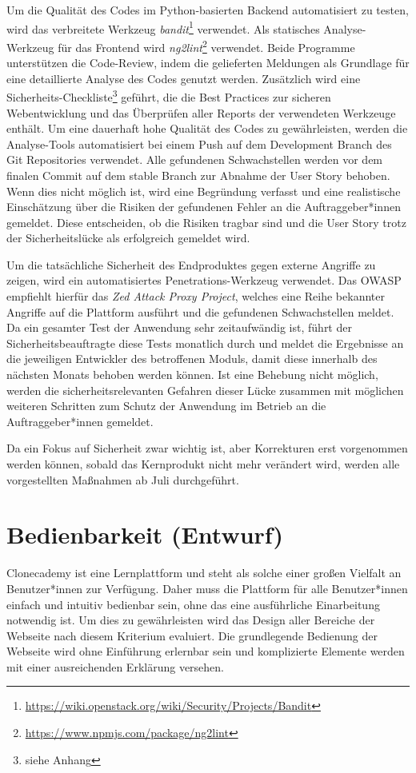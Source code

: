 \documentclass[accentcolor=tud0b,12pt,paper=a4]{tudreport}
\begin{document}
Um die Qualität des Codes im Python-basierten Backend automatisiert zu testen, wird das verbreitete Werkzeug \emph{bandit}\footnote{\href{https://wiki.openstack.org/wiki/Security/Projects/Bandit}{https://wiki.openstack.org/wiki/Security/Projects/Bandit}} verwendet. Als statisches Analyse-Werkzeug für das Frontend wird \emph{ng2lint}\footnote{\href{https://www.npmjs.com/package/ng2lint}{https://www.npmjs.com/package/ng2lint}} verwendet. Beide Programme unterstützen die Code-Review, indem die gelieferten Meldungen als Grundlage für eine detaillierte Analyse des Codes genutzt werden. Zusätzlich wird eine Sicherheits-Checkliste\footnote{siehe Anhang} geführt, die die Best Practices zur sicheren Webentwicklung und das Überprüfen aller Reports der verwendeten Werkzeuge enthält. Um eine dauerhaft hohe Qualität des Codes zu gewährleisten, werden die Analyse-Tools automatisiert bei einem Push auf dem Development Branch des Git Repositories verwendet. Alle gefundenen Schwachstellen werden vor dem finalen Commit auf dem stable Branch zur Abnahme der User Story behoben. Wenn dies nicht möglich ist, wird eine Begründung verfasst und eine realistische Einschätzung über die Risiken der gefundenen Fehler an die Auftraggeber*innen gemeldet. Diese entscheiden, ob die Risiken tragbar sind und die User Story trotz der Sicherheitslücke als erfolgreich gemeldet wird.

Um die tatsächliche Sicherheit des Endproduktes gegen externe Angriffe zu zeigen, wird ein automatisiertes Penetrations-Werkzeug verwendet. Das OWASP empfiehlt hierfür das \emph{Zed Attack Proxy Project}, welches eine Reihe bekannter Angriffe auf die Plattform ausführt und die gefundenen Schwachstellen meldet. Da ein gesamter Test der Anwendung sehr zeitaufwändig ist, führt der Sicherheitsbeauftragte diese Tests monatlich durch und meldet die Ergebnisse an die jeweiligen Entwickler des betroffenen Moduls, damit diese innerhalb des nächsten Monats behoben werden können. Ist eine Behebung nicht möglich, werden die sicherheitsrelevanten Gefahren dieser Lücke zusammen mit möglichen weiteren Schritten zum Schutz der Anwendung im Betrieb an die Auftraggeber*innen gemeldet.

Da ein Fokus auf Sicherheit zwar wichtig ist, aber Korrekturen erst vorgenommen werden können, sobald das Kernprodukt nicht mehr verändert wird, werden alle vorgestellten Maßnahmen ab Juli durchgeführt.

\section{Bedienbarkeit (Entwurf)}
Clonecademy ist eine Lernplattform und steht als solche einer großen Vielfalt an Benutzer*innen zur Verfügung. Daher muss die Plattform für alle Benutzer*innen einfach und intuitiv bedienbar sein, ohne das eine ausführliche Einarbeitung notwendig ist. Um dies zu gewährleisten wird das Design aller Bereiche der Webseite nach diesem Kriterium evaluiert. Die grundlegende Bedienung der Webseite wird ohne Einführung erlernbar sein und komplizierte Elemente werden mit einer ausreichenden Erklärung versehen.
\end{document}
